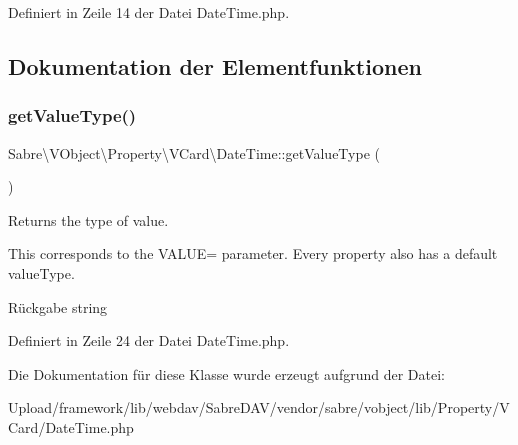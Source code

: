 Definiert in Zeile 14 der Datei Date\+Time.\+php.



\subsection{Dokumentation der Elementfunktionen}
\mbox{\label{class_sabre_1_1_v_object_1_1_property_1_1_v_card_1_1_date_time_a7da3789a731e69e6ce51712668f0d900}} 
\subsubsection{\texorpdfstring{get\+Value\+Type()}{getValueType()}}
{\footnotesize\ttfamily Sabre\textbackslash{}\+V\+Object\textbackslash{}\+Property\textbackslash{}\+V\+Card\textbackslash{}\+Date\+Time\+::get\+Value\+Type (\begin{DoxyParamCaption}{ }\end{DoxyParamCaption})}

Returns the type of value.

This corresponds to the V\+A\+L\+UE= parameter. Every property also has a \textquotesingle{}default\textquotesingle{} value\+Type.

\begin{DoxyReturn}{Rückgabe}
string 
\end{DoxyReturn}


Definiert in Zeile 24 der Datei Date\+Time.\+php.



Die Dokumentation für diese Klasse wurde erzeugt aufgrund der Datei\+:\begin{DoxyCompactItemize}
\item 
Upload/framework/lib/webdav/\+Sabre\+D\+A\+V/vendor/sabre/vobject/lib/\+Property/\+V\+Card/Date\+Time.\+php\end{DoxyCompactItemize}
